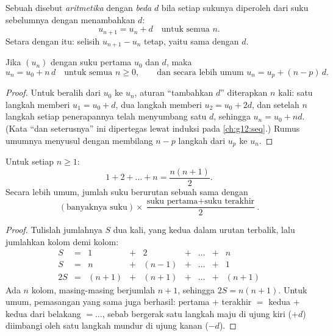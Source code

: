 \begin{definition}\label{def:g11:seq:arithmetic}
Sebuah  disebut \emph{aritmetika} dengan
\emph{beda} $d$ bila setiap sukunya diperoleh dari suku
sebelumnya dengan menambahkan $d$:
\[
u_{n+1} = u_n + d \quad \text{untuk semua } n.
\]
Setara dengan itu: selisih $u_{n+1} - u_n$ tetap, yaitu sama dengan $d$.
\end{definition}

\begin{theorem}\label{thm:g11:seq:arithgeneral}
Jika $(u_n)$  dengan suku pertama $u_0$ dan  $d$,
maka
\[
u_n = u_0 + n\,d \quad \text{untuk semua } n \geq 0,
\qquad\text{dan secara lebih umum } u_n = u_p + (n - p)\,d .
\]
\end{theorem}

\begin{proof}
Untuk beralih dari $u_0$ ke $u_n$, aturan ``tambahkan $d$'' diterapkan $n$
kali: satu langkah memberi $u_1 = u_0 + d$, dua langkah memberi
$u_2 = u_0 + 2d$, dan setelah $n$ langkah setiap penerapannya telah
menyumbang satu $d$, sehingga $u_n = u_0 + nd$. (Kata ``dan seterusnya'' ini
dipertegas lewat induksi pada \cref{ch:g12:seq}.) Rumus umumnya menyusul
dengan membilang $n - p$ langkah dari $u_p$ ke $u_n$.
\end{proof}

\begin{theorem}\label{thm:g11:seq:intsum}
Untuk setiap  $n \geq 1$:
\[
1 + 2 + \dots + n = \frac{n(n+1)}{2}.
\]
Secara lebih umum, jumlah suku berurutan sebuah  sama
dengan
\[
(\text{banyaknya suku}) \times
\frac{\text{suku pertama} + \text{suku terakhir}}{2}.
\]
\end{theorem}

\begin{proof}
Tulislah jumlahnya $S$ dua kali, yang kedua dalam urutan terbalik, lalu
jumlahkan kolom demi kolom:
\[
\begin{array}{ccccccccc}
S & = & 1 & + & 2 & + & \dots & + & n\\
S & = & n & + & (n-1) & + & \dots & + & 1\\
\hline
2S & = & (n+1) & + & (n+1) & + & \dots & + & (n+1)
\end{array}
\]
Ada $n$ kolom, masing-masing berjumlah $n + 1$, sehingga $2S = n(n+1)$. Untuk
 umum, pemasangan yang sama juga berhasil: pertama $+$
terakhir $=$ kedua $+$ kedua dari belakang $= \dots$, sebab bergerak satu
langkah maju di ujung kiri ($+d$) diimbangi oleh satu langkah mundur di ujung
kanan ($-d$).
\end{proof}

